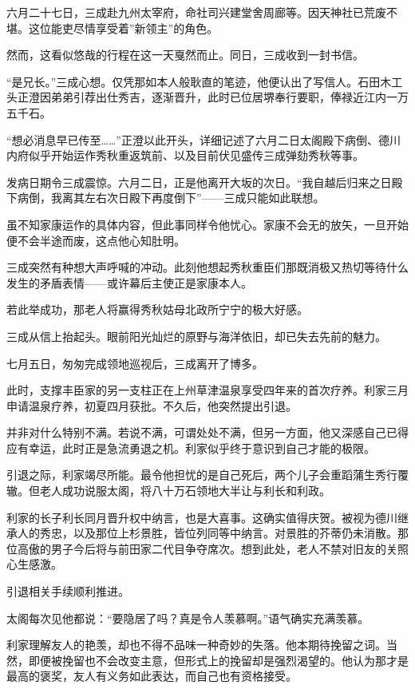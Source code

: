 \documentclass[
]{article}
\begin{document}
六月二十七日，三成赴九州太宰府，命社司兴建堂舍周廊等。因天神社已荒废不堪。这位能吏尽情享受着''新领主''的角色。

然而，这看似悠哉的行程在这一天戛然而止。同日，三成收到一封书信。

``是兄长。''三成心想。仅凭那如本人般耿直的笔迹，他便认出了写信人。石田木工头正澄因弟弟引荐出仕秀吉，逐渐晋升，此时已位居堺奉行要职，俸禄近江内一万五千石。

``想必消息早已传至\ldots\ldots{}''正澄以此开头，详细记述了六月二日太阁殿下病倒、德川内府似乎开始运作秀秋重返筑前、以及目前伏见盛传三成弹劾秀秋等事。

发病日期令三成震惊。六月二日，正是他离开大坂的次日。``我自越后归来之日殿下病倒，我离其左右次日殿下再度倒下''------三成只能如此联想。

虽不知家康运作的具体内容，但此事同样令他忧心。家康不会无的放矢，一旦开始便不会半途而废，这点他心知肚明。

三成突然有种想大声呼喊的冲动。此刻他想起秀秋重臣们那既消极又热切等待什么发生的矛盾表情------或许幕后主使正是家康本人。

若此举成功，那老人将赢得秀秋姑母北政所宁宁的极大好感。

三成从信上抬起头。眼前阳光灿烂的原野与海洋依旧，却已失去先前的魅力。

七月五日，匆匆完成领地巡视后，三成离开了博多。

此时，支撑丰臣家的另一支柱正在上州草津温泉享受四年来的首次疗养。利家三月申请温泉疗养，初夏四月获批。不久后，他突然提出引退。

并非对什么特别不满。若说不满，可谓处处不满，但另一方面，他又深感自己已得应有幸运，此时正是急流勇退之机。利家似乎终于意识到自己才能的极限。

引退之际，利家竭尽所能。最令他担忧的是自己死后，两个儿子会重蹈蒲生秀行覆辙。但老人成功说服太阁，将八十万石领地大半让与利长和利政。

利家的长子利长同月晋升权中纳言，也是大喜事。这确实值得庆贺。被视为德川继承人的秀忠，以及那位上杉景胜，皆位列同等中纳言。对景胜的芥蒂仍未消散。那位高傲的男子今后将与前田家二代目争夺席次。想到此处，老人不禁对旧友的关照心生感激。

引退相关手续顺利推进。

太阁每次见他都说：``要隐居了吗？真是令人羡慕啊。''语气确实充满羡慕。

利家理解友人的艳羡，却也不得不品味一种奇妙的失落。他本期待挽留之词。当然，即便被挽留也不会改变主意，但形式上的挽留却是强烈渴望的。他认为那才是最高的褒奖，友人有义务如此表达，而自己也有资格接受。
\end{document}
